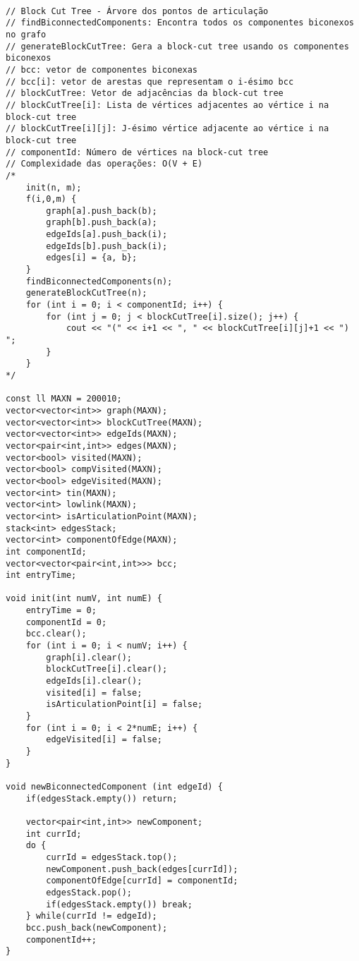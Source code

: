 \documentclass[landscape,twocolumn,10pt,a4paper]{article}
\begin{document}
\begin{verbatim}

// Block Cut Tree - Árvore dos pontos de articulação
// findBiconnectedComponents: Encontra todos os componentes biconexos no grafo
// generateBlockCutTree: Gera a block-cut tree usando os componentes biconexos
// bcc: vetor de componentes biconexas
// bcc[i]: vetor de arestas que representam o i-ésimo bcc
// blockCutTree: Vetor de adjacências da block-cut tree
// blockCutTree[i]: Lista de vértices adjacentes ao vértice i na block-cut tree
// blockCutTree[i][j]: J-ésimo vértice adjacente ao vértice i na block-cut tree
// componentId: Número de vértices na block-cut tree
// Complexidade das operações: O(V + E)
/*
    init(n, m);
    f(i,0,m) {
        graph[a].push_back(b);
        graph[b].push_back(a);
        edgeIds[a].push_back(i);
        edgeIds[b].push_back(i);
        edges[i] = {a, b};
    }
    findBiconnectedComponents(n);
    generateBlockCutTree(n);
    for (int i = 0; i < componentId; i++) {
        for (int j = 0; j < blockCutTree[i].size(); j++) {
            cout << "(" << i+1 << ", " << blockCutTree[i][j]+1 << ") ";
        }
    }
*/

const ll MAXN = 200010;
vector<vector<int>> graph(MAXN);
vector<vector<int>> blockCutTree(MAXN);
vector<vector<int>> edgeIds(MAXN);
vector<pair<int,int>> edges(MAXN);
vector<bool> visited(MAXN);
vector<bool> compVisited(MAXN);
vector<bool> edgeVisited(MAXN);
vector<int> tin(MAXN);
vector<int> lowlink(MAXN);
vector<int> isArticulationPoint(MAXN);
stack<int> edgesStack;
vector<int> componentOfEdge(MAXN);
int componentId;
vector<vector<pair<int,int>>> bcc;
int entryTime;

void init(int numV, int numE) {
    entryTime = 0;
    componentId = 0;
    bcc.clear();
    for (int i = 0; i < numV; i++) {
        graph[i].clear();
        blockCutTree[i].clear();
        edgeIds[i].clear();
        visited[i] = false;
        isArticulationPoint[i] = false;
    }
    for (int i = 0; i < 2*numE; i++) {
        edgeVisited[i] = false;
    }
}

void newBiconnectedComponent (int edgeId) {
    if(edgesStack.empty()) return;
    
    vector<pair<int,int>> newComponent;
    int currId;
    do {
        currId = edgesStack.top();
        newComponent.push_back(edges[currId]);
        componentOfEdge[currId] = componentId;
        edgesStack.pop();
        if(edgesStack.empty()) break;
    } while(currId != edgeId);
    bcc.push_back(newComponent);
    componentId++;
}


\end{verbatim}
\end{document}
